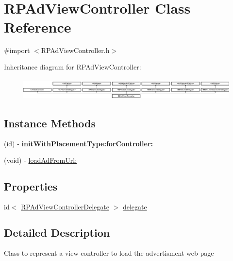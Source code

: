 \hypertarget{interface_r_p_ad_view_controller}{\section{R\-P\-Ad\-View\-Controller Class Reference}
\label{interface_r_p_ad_view_controller}
}


{\ttfamily \#import $<$R\-P\-Ad\-View\-Controller.\-h$>$}

Inheritance diagram for R\-P\-Ad\-View\-Controller\-:\begin{figure}[H]
\begin{center}
\leavevmode
\includegraphics[height=1.159420cm]{interface_r_p_ad_view_controller}
\end{center}
\end{figure}
\subsection*{Instance Methods}
\begin{DoxyCompactItemize}
\item 
\hypertarget{interface_r_p_ad_view_controller_a39db9b2e7b93410d9fca8d8f01c86eca}{(id) -\/ {\bfseries init\-With\-Placement\-Type\-:for\-Controller\-:}}\label{interface_r_p_ad_view_controller_a39db9b2e7b93410d9fca8d8f01c86eca}

\item 
(void) -\/ \hyperlink{interface_r_p_ad_view_controller_a467660a29bc4c9b3ba1ab9b3d50da187}{load\-Ad\-From\-Url\-:}
\end{DoxyCompactItemize}
\subsection*{Properties}
\begin{DoxyCompactItemize}
\item 
id$<$ \hyperlink{protocol_r_p_ad_view_controller_delegate-p}{R\-P\-Ad\-View\-Controller\-Delegate} $>$ \hyperlink{interface_r_p_ad_view_controller_a515c52b9ea07ed1dad9a301a641c110b}{delegate}
\end{DoxyCompactItemize}


\subsection{Detailed Description}
Class to represent a view controller to load the advertisment web page 

